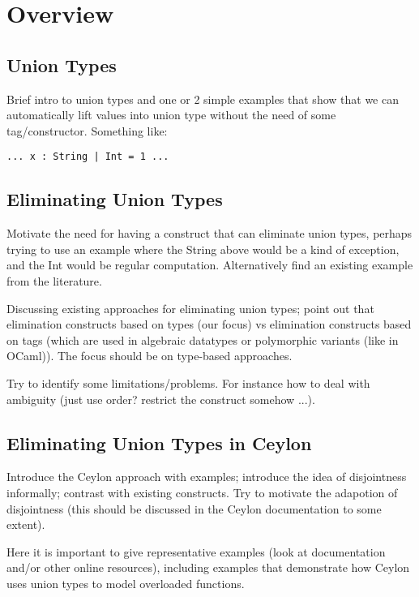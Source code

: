\section{Overview}
\label{sec:overview}


\subsection{Union Types}

Brief intro to union types and one or 2 simple examples that show that we
can automatically lift values into union type without the need of some
tag/constructor. Something like:

\begin{verbatim}
... x : String | Int = 1 ...
\end{verbatim}

\subsection{Eliminating Union Types}

Motivate the need for having a construct that can eliminate union types,
perhaps trying to use an example where the String above would be a kind
of exception, and the Int would be regular computation. Alternatively
find an existing example from the literature.

Discussing existing approaches for eliminating union types;
point out that elimination constructs based on types (our focus) vs
elimination constructs based on tags (which are used in algebraic
datatypes or polymorphic variants (like in OCaml)).
The focus should be on type-based approaches.

Try to identify some limitations/problems. For instance how to deal
with ambiguity (just use order? restrict the construct somehow ...).

\subsection{Eliminating Union Types in Ceylon}

Introduce the Ceylon approach with examples; introduce the idea of
disjointness informally; contrast with existing constructs.
Try to motivate the adapotion of disjointness (this should be discussed
in the Ceylon documentation to some extent).

Here it is important to give representative examples (look at documentation
and/or other online resources), including examples
that demonstrate how Ceylon uses union types to model overloaded functions.

